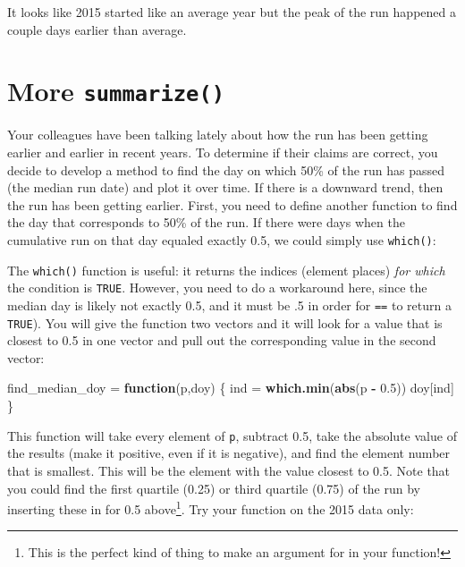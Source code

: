 \documentclass[]{book}
\newenvironment{Shaded}{\begin{snugshade}}{\end{snugshade}}
\newcommand{\KeywordTok}[1]{\textcolor[rgb]{0.13,0.29,0.53}{\textbf{#1}}}
\newcommand{\FloatTok}[1]{\textcolor[rgb]{0.00,0.00,0.81}{#1}}
\newcommand{\StringTok}[1]{\textcolor[rgb]{0.31,0.60,0.02}{#1}}
\newcommand{\ControlFlowTok}[1]{\textcolor[rgb]{0.13,0.29,0.53}{\textbf{#1}}}
\newcommand{\OperatorTok}[1]{\textcolor[rgb]{0.81,0.36,0.00}{\textbf{#1}}}
\newcommand{\NormalTok}[1]{#1}
\let\rmarkdownfootnote\footnote%
\def\footnote{\protect\rmarkdownfootnote}
\theoremstyle{definition}
\theoremstyle{definition}
\theoremstyle{definition}
\theoremstyle{remark}
\begin{document}
It looks like 2015 started like an average year but the peak of the run
happened a couple days earlier than average.

\section{\texorpdfstring{More
\texttt{summarize()}}{More summarize()}}\label{more-summarize}

Your colleagues have been talking lately about how the run has been
getting earlier and earlier in recent years. To determine if their
claims are correct, you decide to develop a method to find the day on
which 50\% of the run has passed (the median run date) and plot it over
time. If there is a downward trend, then the run has been getting
earlier. First, you need to define another function to find the day that
corresponds to 50\% of the run. If there were days when the cumulative
run on that day equaled exactly 0.5, we could simply use
\texttt{which()}:

\begin{Shaded}
\end{Shaded}

The \texttt{which()} function is useful: it returns the indices (element
places) \emph{for which} the condition is \texttt{TRUE}. However, you
need to do a workaround here, since the median day is likely not exactly
0.5, and it must be .5 in order for \texttt{==} to return a
\texttt{TRUE}). You will give the function two vectors and it will look
for a value that is closest to 0.5 in one vector and pull out the
corresponding value in the second vector:

\begin{Shaded}
\begin{Highlighting}[]
\NormalTok{find_median_doy =}\StringTok{ }\ControlFlowTok{function}\NormalTok{(p,doy) \{}
\NormalTok{  ind =}\StringTok{ }\KeywordTok{which.min}\NormalTok{(}\KeywordTok{abs}\NormalTok{(p }\OperatorTok{-}\StringTok{ }\FloatTok{0.5}\NormalTok{))}
\NormalTok{  doy[ind]}
\NormalTok{\}}
\end{Highlighting}
\end{Shaded}

This function will take every element of \texttt{p}, subtract 0.5, take
the absolute value of the results (make it positive, even if it is
negative), and find the element number that is smallest. This will be
the element with the value closest to 0.5. Note that you could find the
first quartile (0.25) or third quartile (0.75) of the run by inserting
these in for 0.5 above\footnote{This is the perfect kind of thing to
  make an argument for in your function!}. Try your function on the 2015
data only:
\end{document}
